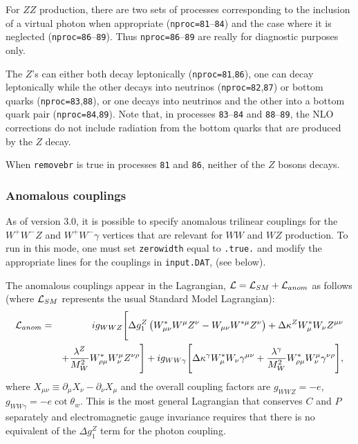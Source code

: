 \documentclass[12pt]{article}
\begin{document}
For $ZZ$ production, there are two sets of processes corresponding to the
inclusion of a virtual photon when appropriate ({\tt nproc=81}--{\tt 84})
and the case where it is neglected ({\tt nproc=86}--{\tt 89}).
Thus {\tt nproc=86}--{\tt 89} are really for diagnostic purposes only.

The $Z$'s can either both decay leptonically ({\tt nproc=81},{\tt 86}),
one can decay leptonically while the other decays into neutrinos
({\tt nproc=82},{\tt 87}) or bottom quarks ({\tt nproc=83},{\tt 88}), or
one decays into neutrinos and the other into a bottom quark pair
({\tt nproc=84},{\tt 89}). Note that, in processes
{\tt 83}--{\tt 84} and {\tt 88}--{\tt 89}, the NLO corrections do not include
radiation from the bottom quarks that are produced by the $Z$ decay.

When {\tt removebr} is true in processes {\tt 81} and {\tt 86},
neither of the $Z$ bosons decays.

\subsubsection{Anomalous couplings}

As of version 3.0, it is possible to specify anomalous trilinear
couplings for the $W^+W^-Z$ and $W^+W^-\gamma$ vertices that are
relevant for $WW$ and $WZ$ production. To run in this mode, one
must set {\tt zerowidth} equal to {\tt .true.}
and modify the appropriate lines for the couplings in {\tt input.DAT},
(see below).

The anomalous couplings appear in the Lagrangian,
${\cal L} = {\cal L}_{SM} + {\cal L}_{anom}$ as follows
(where ${\cal L}_{SM}$ represents the usual Standard Model Lagrangian):
\begin{eqnarray}
{\cal L}_{anom} & = & i g_{WWZ} \Biggl[
 \Delta g_1^Z \left( W^*_{\mu\nu}W^\mu Z^\nu - W_{\mu\nu}W^{*\mu} Z^\nu \right)
+\Delta\kappa^Z W^*_\mu W_\nu Z^{\mu\nu} \nonumber \\
 & &+
 \frac{\lambda^Z}{M_W^2} W^*_{\rho\mu} W^\mu_\nu Z^{\nu\rho} \Biggr]
+i g_{WW\gamma} \Biggl[ 
 \Delta\kappa^\gamma W^*_\mu W_\nu \gamma^{\mu\nu}
+\frac{\lambda^\gamma}{M_W^2} W^*_{\rho\mu} W^\mu_\nu\gamma^{\nu\rho}
 \Biggr], \nonumber
\end{eqnarray}
where $X_{\mu\nu} \equiv \partial_\mu X_{\nu} - \partial_\nu X_{\mu}$
and the overall coupling factors are $g_{WWZ}=-e$,
$g_{WW\gamma}=-e\cot\theta_w$.
This is the most general Lagrangian that conserves $C$ and $P$
separately and electromagnetic gauge invariance requires that there
is no equivalent of the $\Delta g_1^Z$ term for the photon coupling.
\end{document}
